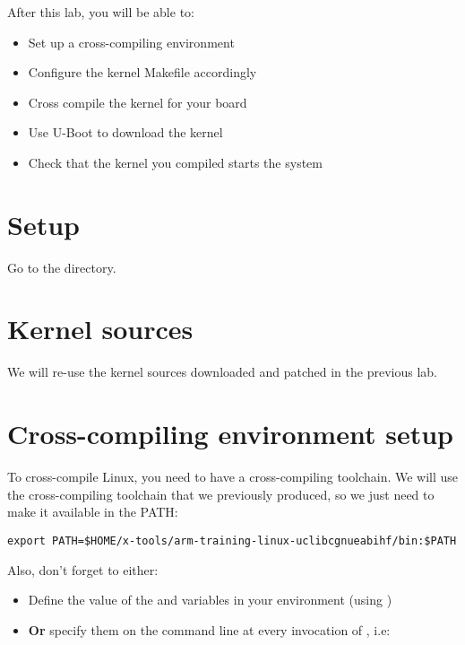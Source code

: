 
After this lab, you will be able to:
\begin{itemize}
\item Set up a cross-compiling environment
\item Configure the kernel Makefile accordingly
\item Cross compile the kernel for your board
\item Use U-Boot to download the kernel
\item Check that the kernel you compiled starts the system
\end{itemize}

\section{Setup}

Go to the  directory.

\section{Kernel sources}

We will re-use the kernel sources downloaded and patched in the
previous lab.

\section{Cross-compiling environment setup}

To cross-compile Linux, you need to have a cross-compiling
toolchain. We will use the cross-compiling toolchain that we
previously produced, so we just need to make it available in the PATH:

\begin{verbatim}
export PATH=$HOME/x-tools/arm-training-linux-uclibcgnueabihf/bin:$PATH
\end{verbatim}

Also, don't forget to either:

\begin{itemize}
\item Define the value of the  and 
  variables in your environment (using )
\item {\bf Or} specify them on the command line at every invocation of
  , i.e: 
\end{itemize}

